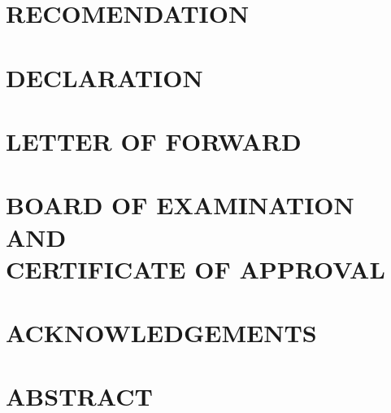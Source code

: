 \documentclass[12pt]{report}
\begin{document}

{ 



\chapter*{\fontb RECOMENDATION}



\chapter*{\fontb DECLARATION}



\chapter*{\fontb LETTER OF FORWARD}



\chapter*{\fontb BOARD OF EXAMINATION AND\\
CERTIFICATE OF APPROVAL}
	


\chapter*{\fontb ACKNOWLEDGEMENTS}



\chapter*{\fontb ABSTRACT}



}

\chapter*{\vspace{-2.5cm} \centering{}}


\end{document}
